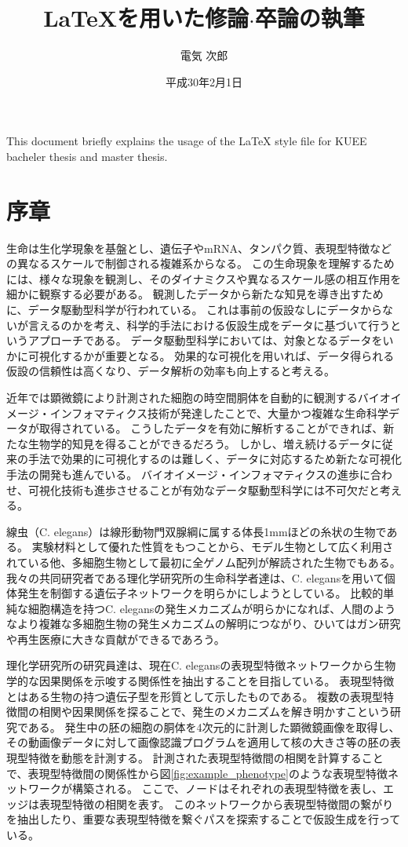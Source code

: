 \documentclass{kuee}
\title{\LaTeX を用いた修論$\cdot$卒論の執筆}
\author{電気 次郎}
\date{平成30年2月1日}
\begin{document}
\maketitle      %
\begin{eabstract}   %
This document briefly explains the usage of the \LaTeX{} style file
for KUEE bacheler thesis and master thesis.
\end{eabstract}
\tableofcontents    %

\chapter{序章}
\label{chap:intro}
生命は生化学現象を基盤とし、遺伝子やmRNA、タンパク質、表現型特徴などの異なるスケールで制御される複雑系からなる。
この生命現象を理解するためには、様々な現象を観測し、そのダイナミクスや異なるスケール感の相互作用を細かに観察する必要がある。
観測したデータから新たな知見を導き出すために、データ駆動型科学が行われている。
これは事前の仮設なしにデータからないが言えるのかを考え、科学的手法における仮設生成をデータに基づいて行うというアプローチである。
データ駆動型科学においては、対象となるデータをいかに可視化するかが重要となる。
効果的な可視化を用いれば、データ得られる仮設の信頼性は高くなり、データ解析の効率も向上すると考える。

近年では顕微鏡により計測された細胞の時空間胴体を自動的に観測するバイオイメージ・インフォマティクス技術が発達したことで、大量かつ複雑な生命科学データが取得されている。
こうしたデータを有効に解析することができれば、新たな生物学的知見を得ることができるだろう。
しかし、増え続けるデータに従来の手法で効果的に可視化するのは難しく、データに対応するため新たな可視化手法の開発も進んでいる。
バイオイメージ・インフォマティクスの進歩に合わせ、可視化技術も進歩させることが有効なデータ駆動型科学には不可欠だと考える。

線虫（C. elegans）は線形動物門双腺綱に属する体長1mmほどの糸状の生物である。
実験材料として優れた性質をもつことから、モデル生物として広く利用されている他、多細胞生物として最初に全ゲノム配列が解読された生物でもある。
我々の共同研究者である理化学研究所の生命科学者達は、C. elegansを用いて個体発生を制御する遺伝子ネットワークを明らかにしようとしている。
比較的単純な細胞構造を持つC. elegansの発生メカニズムが明らかになれば、人間のようなより複雑な多細胞生物の発生メカニズムの解明につながり、ひいてはガン研究や再生医療に大きな貢献ができるであろう。

理化学研究所の研究員達は、現在C. elegansの表現型特徴ネットワークから生物学的な因果関係を示唆する関係性を抽出することを目指している。
表現型特徴とはある生物の持つ遺伝子型を形質として示したものである。
複数の表現型特徴間の相関や因果関係を探ることで、発生のメカニズムを解き明かすこという研究である。
発生中の胚の細胞の胴体を4次元的に計測した顕微鏡画像を取得し、その動画像データに対して画像認識プログラムを適用して核の大きさ等の胚の表現型特徴を動態を計測する。
計測された表現型特徴間の相関を計算することで、表現型特徴間の関係性から図\ref{fig:example_phenotype}のような表現型特徴ネットワークが構築される。
ここで、ノードはそれぞれの表現型特徴を表し、エッジは表現型特徴の相関を表す。
このネットワークから表現型特徴間の繋がりを抽出したり、重要な表現型特徴を繋ぐパスを探索することで仮設生成を行っている。
\end{document}
